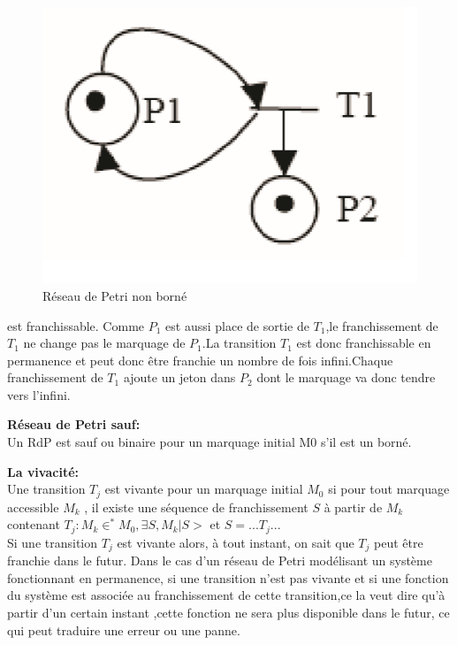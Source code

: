 \begin{figure}[h]
	\centering
	\includegraphics[width=0.5\linewidth]{images/Rdpborn}
	\caption{Réseau de Petri non borné}
	\label{fig:rdpborn}
\end{figure}

est franchissable. Comme $ P_{1} $ est aussi place de sortie de $ T_{1} $,le franchissement de $ T_{1} $ ne change pas le marquage de $ P_{1} $.La transition $ T_{1} $ est donc franchissable en permanence et peut donc être franchie un nombre de fois infini.Chaque franchissement de $ T_{1} $ ajoute un jeton dans $ P_{2} $ dont le marquage va donc tendre vers l'infini.

\begin{defn}\textbf{Réseau de Petri sauf:}\\
	Un RdP est sauf ou binaire pour un marquage initial M0 s'il est un borné.
 
\end{defn}


\begin{defn}\textbf{La vivacité:}\\
	Une transition $ T_{j} $ est vivante pour un marquage initial $ M_{0} $ si pour tout marquage accessible $ M_{k} $ , il existe une séquence de franchissement $ S $ à partir de $ M_{k} $ contenant $T_{j}: M_{k} \in^{*} M_{0},   \exists S,M_{k}| S>$ et $S = ... T_{j} ...$
	\\
	
	Si une transition $ T_{j} $ est vivante alors, à tout instant, on sait que $ T_{j} $ peut être franchie dans le futur. Dans le cas d'un réseau de Petri modélisant un système fonctionnant en permanence, si une transition n'est pas vivante et si une fonction du système est associée au franchissement de cette transition,ce la veut dire qu'à partir d’un certain instant ,cette fonction ne sera plus disponible dans le futur, ce qui peut traduire une erreur ou une panne.
	
\end{defn}



